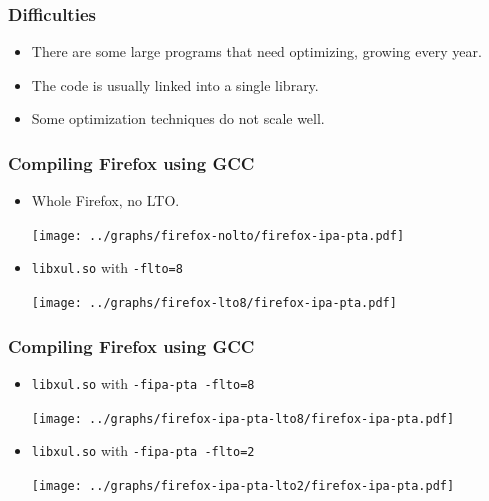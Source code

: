 \documentclass{beamer}
\begin{document}
\begin{frame}[t]
\frametitle{Difficulties}
\begin{itemize}
		\item<1-> There are some large programs that need optimizing, growing every
			year.

		\item<2-> The code is usually linked into a single library.

		
		\item<3-> Some optimization techniques do not scale well.
\end{itemize}
\end{frame}


\begin{frame}[t]
	\frametitle{Compiling Firefox using GCC}
	\begin{itemize}
		\item {Whole Firefox, no LTO.}

			{\hspace{1.5cm}\texttt{[image: ../graphs/firefox-nolto/firefox-ipa-pta.pdf]}}

		\pause
		\item {{\tt libxul.so} with {\tt -flto=8}}

			{\hspace{1.5cm}\texttt{[image: ../graphs/firefox-lto8/firefox-ipa-pta.pdf]}}

	\end{itemize}
\end{frame}


\begin{frame}[t]
	\frametitle{Compiling Firefox using GCC}
	\begin{itemize}
		\item {{\tt libxul.so} with {\tt -fipa-pta -flto=8}}

			{\hspace{1.5cm}\texttt{[image: ../graphs/firefox-ipa-pta-lto8/firefox-ipa-pta.pdf]}}

		\pause
		\item {{\tt libxul.so} with {\tt -fipa-pta -flto=2}}

			{\hspace{1.5cm}\texttt{[image: ../graphs/firefox-ipa-pta-lto2/firefox-ipa-pta.pdf]}}

	\end{itemize}
\end{frame}
\end{document}

